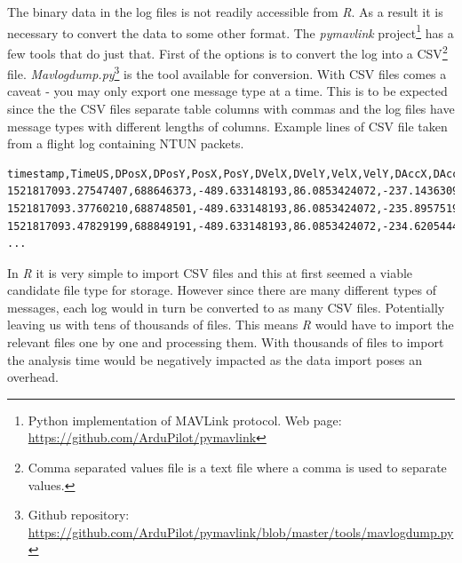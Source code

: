 \documentclass[12pt,oneside]{reedthesis}
\theoremstyle{definition}
\theoremstyle{definition}
\theoremstyle{definition}
\theoremstyle{remark}
\begin{document}
The binary data in the log files is not readily accessible from
\emph{R}. As a result it is necessary to convert the data to some other
format. The \emph{pymavlink} project\footnote{Python implementation of
  MAVLink protocol. Web page:
  \url{https://github.com/ArduPilot/pymavlink}} has a few tools that do
just that. First of the options is to convert the log into a
CSV\footnote{Comma separated values file is a text file where a comma is
  used to separate values.} file. \emph{Mavlogdump.py}\footnote{Github
  repository:
  \url{https://github.com/ArduPilot/pymavlink/blob/master/tools/mavlogdump.py}}
is the tool available for conversion. With CSV files comes a caveat -
you may only export one message type at a time. This is to be expected
since the the CSV files separate table columns with commas and the log
files have message types with different lengths of columns. Example
lines of CSV file taken from a flight log containing NTUN packets.
\begin{verbatim}
timestamp,TimeUS,DPosX,DPosY,PosX,PosY,DVelX,DVelY,VelX,VelY,DAccX,DAccY
1521817093.27547407,688646373,-489.633148193,86.0853424072,-237.143630981...
1521817093.37760210,688748501,-489.633148193,86.0853424072,-235.895751953...
1521817093.47829199,688849191,-489.633148193,86.0853424072,-234.620544434...
...
\end{verbatim}
In \emph{R} it is very simple to import CSV files and this at first
seemed a viable candidate file type for storage. However since there are
many different types of messages, each log would in turn be converted to
as many CSV files. Potentially leaving us with tens of thousands of
files. This means \emph{R} would have to import the relevant files one
by one and processing them. With thousands of files to import the
analysis time would be negatively impacted as the data import poses an
overhead.
\end{document}
